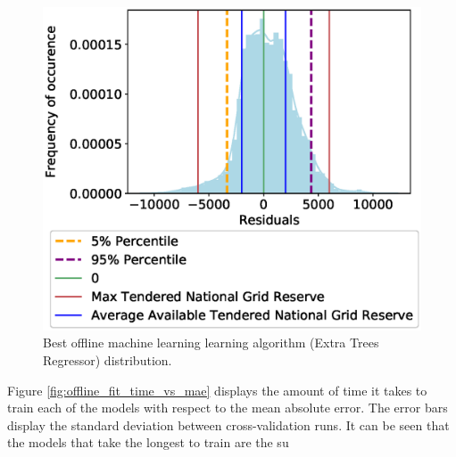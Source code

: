 \documentclass[final,3p,times,twocolumn,numbers]{elsarticle}
\begin{document}
\begin{figure}
\centering
\includegraphics[width=\columnwidth,natwidth=500,natheight=500]{figures/results/ExtraTreesRegressor_distribution_plot.eps}
\caption{Best offline machine learning learning algorithm (Extra Trees Regressor) distribution.}
\label{fig:best_offline_learning_day_distribution}
\end{figure}


Figure \ref{fig:offline_fit_time_vs_mae} displays the amount of time it takes to train each of the models with respect to the mean absolute error. The error bars display the standard deviation between cross-validation runs. It can be seen that the models that take the longest to train are the su
\end{document}
